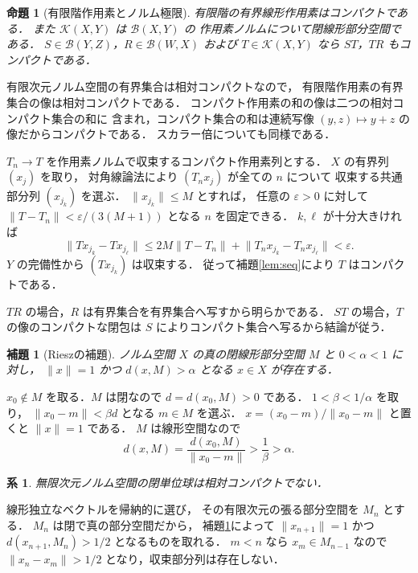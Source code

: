\documentclass[a5paper,10pt,onecolumn]{jsarticle}
\makeatletter
\theoremstyle{mathnotetheorem}
\newtheorem{lemma}[theorem]{補題}
\newtheorem{proposition}[theorem]{命題}
\newtheorem{corollary}[theorem]{系}
\renewcommand{\proofname}{証明}
\renewenvironment{proof}[1][\proofname]{%
  \par\pushQED{\qed}\normalfont\topsep4\p@\@plus2\p@\relax
  \trivlist\item[\hskip\labelsep\bfseries #1]\ignorespaces
}{\popQED\endtrivlist\@endpefalse}
\newcommand{\norm}[1]{\lVert #1\rVert}
\makeatother
\begin{document}
\begin{proposition}[有限階作用素とノルム極限]\label{prop:compact-basics}
有限階の有界線形作用素はコンパクトである．
また $\mathcal K(X,Y)$ は $\mathcal B(X,Y)$ の
作用素ノルムについて閉線形部分空間である．
$S\in\mathcal B(Y,Z)$，$R\in\mathcal B(W,X)$ および
$T\in\mathcal K(X,Y)$ なら $ST$，$TR$ もコンパクトである．
\end{proposition}
\begin{proof}
有限次元ノルム空間の有界集合は相対コンパクトなので，
有限階作用素の有界集合の像は相対コンパクトである．
コンパクト作用素の和の像は二つの相対コンパクト集合の和に
含まれ，コンパクト集合の和は連続写像
$(y,z)\mapsto y+z$ の像だからコンパクトである．
スカラー倍についても同様である．

$T_n\to T$ を作用素ノルムで収束するコンパクト作用素列とする．
$X$ の有界列 $(x_j)$ を取り，
対角線論法により $(T_nx_j)$ が全ての $n$ について
収束する共通部分列 $(x_{j_k})$ を選ぶ．
$\norm{x_{j_k}}\le M$ とすれば，
任意の $\varepsilon>0$ に対して
$\norm{T-T_n}<\varepsilon/(3(M+1))$ となる $n$ を固定できる．
$k,\ell$ が十分大きければ
\[
 \norm{Tx_{j_k}-Tx_{j_\ell}}
 \le 2M\norm{T-T_n}
   +\norm{T_nx_{j_k}-T_nx_{j_\ell}}<\varepsilon.
\]
$Y$ の完備性から $(Tx_{j_k})$ は収束する．
従って補題\ref{lem:seq}により $T$ はコンパクトである．

$TR$ の場合，$R$ は有界集合を有界集合へ写すから明らかである．
$ST$ の場合，$T$ の像のコンパクトな閉包は
$S$ によりコンパクト集合へ写るから結論が従う．
\end{proof}

\begin{lemma}[Rieszの補題]\label{lem:riesz}
ノルム空間 $X$ の真の閉線形部分空間 $M$ と
$0<\alpha<1$ に対し，
$\norm x=1$ かつ $d(x,M)>\alpha$ となる $x\in X$ が存在する．
\end{lemma}
\begin{proof}
$x_0\notin M$ を取る．$M$ は閉なので
$d=d(x_0,M)>0$ である．
$1<\beta<1/\alpha$ を取り，
$\norm{x_0-m}<\beta d$ となる $m\in M$ を選ぶ．
$x=(x_0-m)/\norm{x_0-m}$ と置くと $\norm x=1$ である．
$M$ は線形空間なので
\[
 d(x,M)=\frac{d(x_0,M)}{\norm{x_0-m}}
 >\frac1\beta>\alpha.
\]
\end{proof}

\begin{corollary}\label{cor:finite-dim}
無限次元ノルム空間の閉単位球は相対コンパクトでない．
\end{corollary}
\begin{proof}
線形独立なベクトルを帰納的に選び，
その有限次元の張る部分空間を $M_n$ とする．
$M_n$ は閉で真の部分空間だから，
補題\ref{lem:riesz}によって
$\norm{x_{n+1}}=1$ かつ
$d(x_{n+1},M_n)>1/2$ となるものを取れる．
$m<n$ なら $x_m\in M_{n-1}$ なので
$\norm{x_n-x_m}>1/2$ となり，収束部分列は存在しない．
\end{proof}
\end{document}

